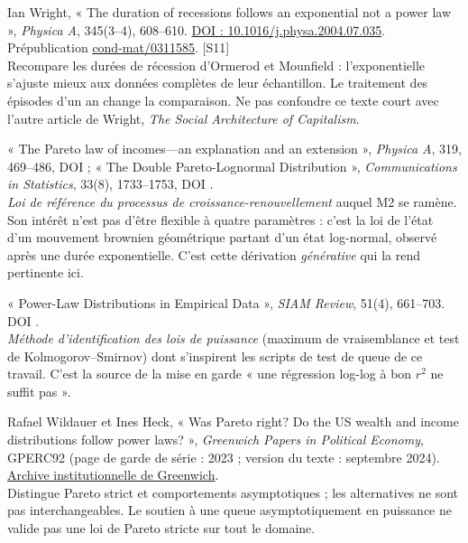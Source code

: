 \begin{description}[leftmargin=1.6em,style=nextline,itemsep=0.35em]
\item[Wright (2005)] Ian Wright, « The duration of recessions follows an
  exponential not a power law », \emph{Physica A}, 345(3--4), 608--610.
  \href{https://doi.org/10.1016/j.physa.2004.07.035}{DOI : 10.1016/j.physa.2004.07.035}.
  Prépublication \href{https://arxiv.org/abs/cond-mat/0311585}{cond-mat/0311585}.
  \textsf{[S11]}\\
  Recompare les durées de récession d'Ormerod et Mounfield : l'exponentielle
  s'ajuste mieux aux données complètes de leur échantillon. Le traitement des
  épisodes d'un an change la comparaison. Ne pas confondre ce texte court avec
  l'autre article de Wright, \emph{The Social Architecture of Capitalism}.

\item[Reed (2003) ; Reed et Jorgensen (2004)] « The Pareto law of incomes---an
  explanation and an extension », \emph{Physica A}, 319, 469--486, DOI
   ; « The Double Pareto-Lognormal
  Distribution », \emph{Communications in Statistics}, 33(8), 1733--1753, DOI
  .\\
  \emph{Loi de référence du processus de croissance-renouvellement} auquel M2
  se ramène. Son intérêt n'est pas d'être flexible à quatre paramètres : c'est
  la loi de l'état d'un mouvement brownien géométrique partant d'un état
  log-normal, observé après une durée exponentielle. C'est cette dérivation
  \emph{générative} qui la rend pertinente ici.

\item[Clauset, Shalizi et Newman (2009)] « Power-Law Distributions in
  Empirical Data », \emph{SIAM Review}, 51(4), 661--703.
  DOI .\\
  \emph{Méthode d'identification des lois de puissance} (maximum de
  vraisemblance et test de Kolmogorov--\allowbreak Smirnov) dont s'inspirent les scripts de
  test de queue de ce travail. C'est la source de la mise en garde
  « une régression log-log à bon $r^2$ ne suffit pas ».

\item[Wildauer et Heck (version septembre 2024)] Rafael Wildauer et Ines Heck,
  « Was Pareto right? Do the US wealth and income distributions follow power
  laws? », \emph{Greenwich Papers in Political Economy}, GPERC92
  (page de garde de série : 2023 ; version du texte : septembre 2024).
  \href{https://gala.gre.ac.uk/id/eprint/38597/13/38597\%20WILDAUER_Was_Pareto_right_Is_the_distribution_of\%20wealth_thick_tailed_(REVISED)_2023.pdf}{Archive institutionnelle de Greenwich}.\\
  Distingue Pareto strict et comportements asymptotiques ; les alternatives
  ne sont pas interchangeables. Le soutien à une queue asymptotiquement en
  puissance ne valide pas une loi de Pareto stricte sur tout le domaine.


\end{description}
